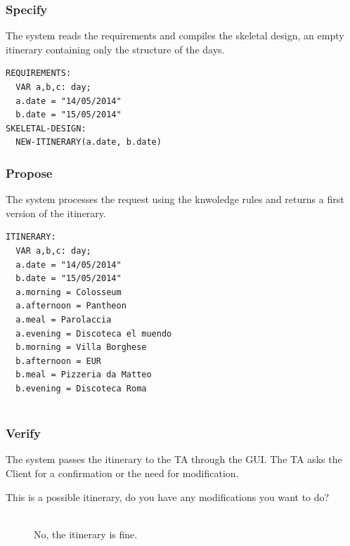 \documentclass[11pt]{article} %
\begin{document}
\subsubsection{Specify}
The system reads the requirements and compiles the skeletal design, an empty itinerary containing only the structure of the days.

\begin{lstlisting}[breaklines=true,mathescape=true]
REQUIREMENTS:
  VAR a,b,c: day;
  a.date = "14/05/2014"
  b.date = "15/05/2014"
SKELETAL-DESIGN:
  NEW-ITINERARY(a.date, b.date)
\end{lstlisting}

\subsubsection{Propose}
The system processes the request using the knwoledge rules and returns a first version of the itinerary.

\begin{lstlisting}[breaklines=true,mathescape=true]
ITINERARY:
  VAR a,b,c: day;
  a.date = "14/05/2014"
  b.date = "15/05/2014"
  a.morning = Colosseum
  a.afternoon = Pantheon
  a.meal = Parolaccia
  a.evening = Discoteca el muendo
  b.morning = Villa Borghese
  b.afternoon = EUR
  b.meal = Pizzeria da Matteo
  b.evening = Discoteca Roma
  
\end{lstlisting}

\subsubsection{Verify}
The system passes the itinerary to the TA through the GUI. The TA asks the Client for a confirmation or the need for modification.

\begin{description}
  \item[This is a possible itinerary, do you have any modifications you want to do?] \hfill \\
  No, the itinerary is fine.
\end{description}
\end{document}
